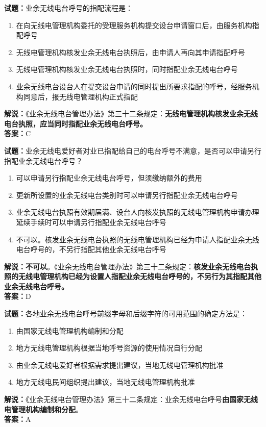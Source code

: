 \documentclass{ctexbook}
\begin{document}
\bigskip

\noindent\textbf{试题：}业余无线电台呼号的指配流程是：
\begin{enumerate}[leftmargin=3em]
  \item 在向无线电管理机构委托的受理服务机构提交设台申请窗口后，由服务机构指配呼号
  \item 无线电管理机构核发业余无线电台执照后，由申请人再向其申请指配呼号
  \item 无线电管理机构核发业余无线电台执照时，同时指配业余无线电台呼号
  \item 业余无线电台设台人在提交设台申请的同时提出所要求指配的呼号，经服务机构同意后，报无线电管理机构正式指配
\end{enumerate}
\noindent\textbf{解说：}《业余无线电台管理办法》第三十二条规定：\textbf{无线电管理机构核发业余无线电台执照，应当同时指配业余无线电台呼号。}\\\noindent\textbf{答案：}C

\bigskip

\noindent\textbf{试题：}业余无线电爱好者对业已指配给自己的电台呼号不满意，是否可以申请另行指配业余无线电台呼号？
\begin{enumerate}[leftmargin=3em]
  \item 可以申请另行指配业余无线电台呼号，但须缴纳额外的费用
  \item 更新所设置的业余无线电台类别时可以申请另行指配业余无线电台呼号
  \item 业余无线电台执照有效期届满、设台人向核发执照的无线电管理机构申请办理延续手续时可以申请另行指配业余无线电台呼号
  \item 不可以。核发业余无线电台执照的无线电管理机构已经为申请人指配业余无线电台呼号的，不另行指配其他业余无线电台呼号
\end{enumerate}
\textbf{解说：不可以}。《业余无线电台管理办法》第三十二条规定：\textbf{核发业余无线电台执照的无线电管理机构已经为设置人指配业余无线电台呼号的，不另行为其指配其他业余无线电台呼号。}\\\noindent\textbf{答案：}D

\bigskip

\noindent\textbf{试题：}各地业余无线电台呼号前缀字母和后缀字符的可用范围的确定方法是：
\begin{enumerate}[leftmargin=3em]
  \item 由国家无线电管理机构编制和分配
  \item 地方无线电管理机构根据当地呼号资源的使用情况自行分配
  \item 由业余无线电爱好者根据需求提出建议，当地无线电管理机构批准
  \item 地方无线电民间组织提出建议，当地无线电管理机构批准
\end{enumerate}
\noindent\textbf{解说：}《业余无线电台管理办法》第三十二条规定：业余无线电台呼号\textbf{由国家无线电管理机构编制和分配}。\\\noindent\textbf{答案：}A
\end{document}
